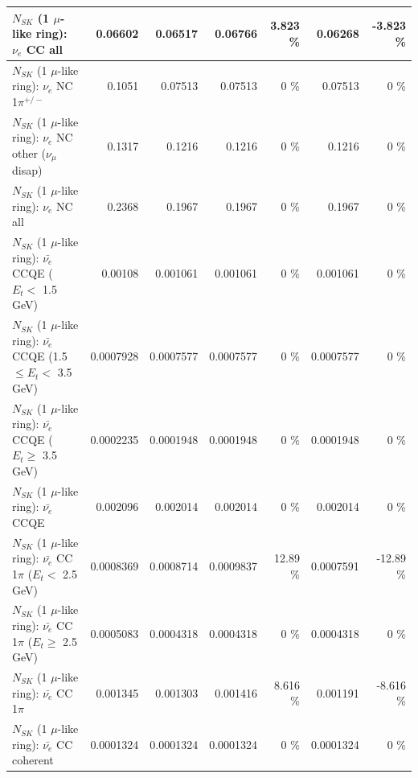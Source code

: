 \begin{table}
\begin{tabular}{| l | r | r | r  r | r  r |}
                                  $N_{SK}$ (1 $\mu$-like ring): $\nu_{e}$ CC all &         0.06602 &         0.06517 &         0.06766 &    3.823 \%  &         0.06268 &   -3.823 \%  \\ 
\hline
                           $N_{SK}$ (1 $\mu$-like ring): $\nu_e$ NC 1$\pi^{+/-}$ &          0.1051 &         0.07513 &         0.07513 &        0 \%  &         0.07513 &        0 \%  \\ 
                $N_{SK}$ (1 $\mu$-like ring): $\nu_e$ NC other ($\nu_\mu$ disap) &          0.1317 &          0.1216 &          0.1216 &        0 \%  &          0.1216 &        0 \%  \\ 
                                  $N_{SK}$ (1 $\mu$-like ring): $\nu_{e}$ NC all &          0.2368 &          0.1967 &          0.1967 &        0 \%  &          0.1967 &        0 \%  \\ 
\hline
\hline
\hline
            $N_{SK}$ (1 $\mu$-like ring): $\bar{\nu_e}$ CCQE ($E_{t} <$ 1.5 GeV) &         0.00108 &        0.001061 &        0.001061 &        0 \%  &        0.001061 &        0 \%  \\ 
   $N_{SK}$ (1 $\mu$-like ring): $\bar{\nu_e}$ CCQE (1.5 $\leq E_{t} <$ 3.5 GeV) &       0.0007928 &       0.0007577 &       0.0007577 &        0 \%  &       0.0007577 &        0 \%  \\ 
         $N_{SK}$ (1 $\mu$-like ring): $\bar{\nu_e}$ CCQE ($E_{t} \geq$ 3.5 GeV) &       0.0002235 &       0.0001948 &       0.0001948 &        0 \%  &       0.0001948 &        0 \%  \\ 
\hline
                                $N_{SK}$ (1 $\mu$-like ring): $\bar{\nu_e}$ CCQE &        0.002096 &        0.002014 &        0.002014 &        0 \%  &        0.002014 &        0 \%  \\ 
\hline
       $N_{SK}$ (1 $\mu$-like ring): $\bar{\nu_e}$ CC 1$\pi$ ($E_{t} <$ 2.5 GeV) &       0.0008369 &       0.0008714 &       0.0009837 &    12.89 \%  &       0.0007591 &   -12.89 \%  \\ 
    $N_{SK}$ (1 $\mu$-like ring): $\bar{\nu_e}$ CC 1$\pi$ ($E_{t} \geq$ 2.5 GeV) &       0.0005083 &       0.0004318 &       0.0004318 &        0 \%  &       0.0004318 &        0 \%  \\ 
\hline
                           $N_{SK}$ (1 $\mu$-like ring): $\bar{\nu_e}$ CC 1$\pi$ &        0.001345 &        0.001303 &        0.001416 &    8.616 \%  &        0.001191 &   -8.616 \%  \\ 
                         $N_{SK}$ (1 $\mu$-like ring): $\bar{\nu_e}$ CC coherent &       0.0001324 &       0.0001324 &       0.0001324 &        0 \%  &       0.0001324 &        0 \%  \\ 

\end{tabular}
\end{table}
